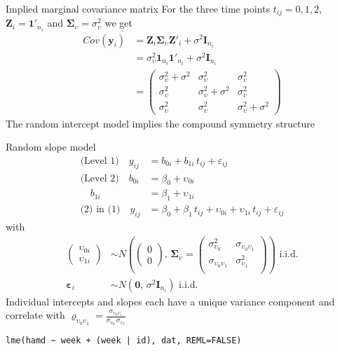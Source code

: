 \documentclass{beamer}
\newcommand{\vect}[1]{\mathbf{#1}}
\newcommand{\mat}[1]{\mathbf{#1}}
\newcommand{\gvect}[1]{\boldsymbol{#1}}
\newcommand{\gmat}[1]{\boldsymbol{#1}}
\begin{document}
\begin{frame}{Implied marginal covariance matrix}
For the three time points $t_{ij} = 0, 1, 2$, $\mat{Z}_i = \vect{1}'_{n_i}$
  and $\gmat{\Sigma}_\upsilon = \sigma^2_\upsilon$ we get
\begin{align*}
  Cov(\vect{y}_i) &=
    \mat{Z}_i \gmat{\Sigma}_\upsilon \mat{Z}'_i + \sigma^2 \mat{I}_{n_i} \\
  &= \sigma^2_\upsilon \vect{1}_{n_i} \vect{1}'_{n_i} +
     \sigma^2 \mat{I}_{n_i} \\
  &= 
  \begin{pmatrix}
    \sigma^2_\upsilon + \sigma^2 & \sigma^2_\upsilon & \sigma^2_\upsilon \\
    \sigma^2_\upsilon & \sigma^2_\upsilon + \sigma^2 & \sigma^2_\upsilon \\
    \sigma^2_\upsilon & \sigma^2_\upsilon & \sigma^2_\upsilon + \sigma^2
  \end{pmatrix}
\end{align*}
The random intercept model implies the compound symmetry structure
\end{frame}

\begin{frame}[fragile]{Random slope model}
\begin{align*}
\text{(Level 1)}  \quad y_{ij} &= b_{0i} + b_{1i}\,t_{ij} + \varepsilon_{ij}\\
\text{(Level 2)}  \quad b_{0i} &= \beta_0 + \upsilon_{0i}\\
                  \quad b_{1i} &= \beta_1 + \upsilon_{1i}\\
\text{(2) in (1)} \quad y_{ij} &= \beta_0 + \beta_1\,t_{ij} +
                   \upsilon_{0i} + \upsilon_{1i} \, t_{ij}+ \varepsilon_{ij}
\end{align*}
with
\begin{align*}
  \begin{pmatrix} \upsilon_{0i}\\ \upsilon_{1i} \end{pmatrix} &\sim
    N \left(\begin{pmatrix} 0\\ 0 \end{pmatrix}, \, \gmat{\Sigma}_\upsilon =
      \begin{pmatrix}
        \sigma^2_{\upsilon_0} & \sigma_{\upsilon_0 \upsilon_1} \\
        \sigma_{\upsilon_0 \upsilon_1} & \sigma^2_{\upsilon_1} \\
      \end{pmatrix} \right)
    \text{ i.i.d.} \\
  \gvect{\varepsilon}_i &\sim N(\vect{0}, \, \sigma^2 \mat{I}_{n_i})
    \text{ i.i.d.}
\end{align*}
Individual intercepts and slopes each have a unique variance component and
  correlate with $\varrho_{\upsilon_0 \upsilon_1} =
  \frac{\sigma_{\upsilon_0 \upsilon_1}}{\sigma_{\upsilon_0} \,
  \sigma_{\upsilon_1}}$
%
\begin{lstlisting}
lme(hamd ~ week + (week | id), dat, REML=FALSE)
\end{lstlisting}
\end{frame}
\end{document}
